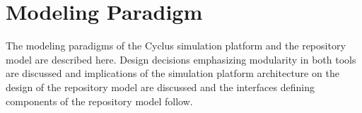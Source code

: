 \chapter{Modeling Paradigm}\label{ch:paradigm}

The modeling paradigms of the Cyclus simulation platform and the \Cyder 
repository model are described here. Design decisions emphasizing modularity in 
both tools are discussed and implications of the simulation platform 
architecture on the design of the repository model are discussed and the 
interfaces defining components of the repository model follow. 




